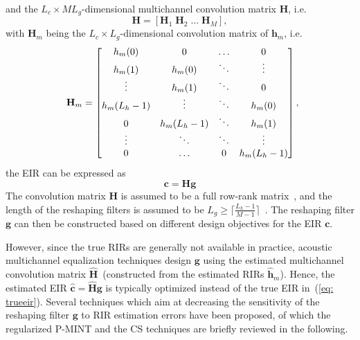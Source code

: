 \documentclass{article}
\begin{document}
and the $L_c \times ML_g$-dimensional multichannel convolution matrix $\mathbf{H}$, i.e.
\begin{equation}
  \mathbf{H} = [\mathbf{H}_1 \; \mathbf{H}_2 \; \ldots \; \mathbf{H}_M],
\end{equation}
with $\mathbf{H}_m$ being the $L_c \times L_g$-dimensional convolution matrix of $\mathbf{h}_m$, i.e.
\begin{equation}
\hspace{-0.2cm}
\mathbf{H}_m =  \begin{bmatrix}
    h_m(0) & 0 &  \ldots & 0 \\
    h_m(1) & h_m(0) & \ddots & \vdots \\
    \vdots & h_m(1) & \ddots & 0 \\
    h_m(L_h-1) & \vdots & \ddots & h_m(0) \\
    0 & h_m(L_h-1) & \ddots & h_m(1) \\
    \vdots & \ddots & \ddots & \vdots \\
    0 & \ldots & 0 & h_m(L_h-1)
   \end{bmatrix},\hspace{-0.4cm}
 \end{equation}
the EIR can be expressed as
\begin{equation}
  \label{eq: trueeir}
  \boxed{\mathbf{c} = \mathbf{H} \mathbf{g}}
\end{equation}
The convolution matrix $\mathbf{H}$ is assumed to be a full row-rank matrix~\cite{Harikumar_ITSP_1998}, and the length of the reshaping filters is assumed to be $L_g \geq \lceil \frac{L_h-1}{M-1} \rceil$~\cite{Miyoshi_ITASS_1988}.
The reshaping filter $\mathbf{g}$ can then be constructed based on different design objectives for the EIR $\mathbf{c}$.

However, since the true RIRs are generally not available in practice, acoustic multichannel equalization techniques design $\mathbf{g}$ using the estimated multichannel convolution matrix $\hat{\mathbf{H}}$~(constructed from the estimated RIRs $\hat{\mathbf{h}}_m$).
Hence, the estimated EIR $\hat{\mathbf{c}} = \hat{\mathbf{H}}\mathbf{g}$ is typically optimized instead of the true EIR in~(\ref{eq: trueeir}).
Several techniques which aim at decreasing the sensitivity of the reshaping filter $\mathbf{g}$ to RIR estimation errors have been proposed, of which the regularized P-MINT and the CS techniques are briefly reviewed in the following.
\end{document}
